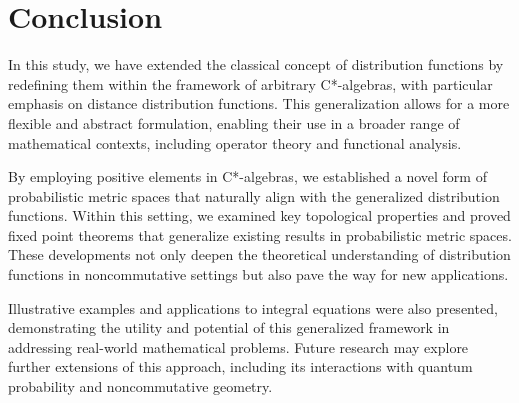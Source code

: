 \documentclass{amsart}%
\theoremstyle{plain}
\numberwithin{equation}{section}
\begin{document}
\section{Conclusion}

In this study, we have extended the classical concept of distribution functions by redefining them within the framework of arbitrary C*-algebras, with particular emphasis on distance distribution functions. This generalization allows for a more flexible and abstract formulation, enabling their use in a broader range of mathematical contexts, including operator theory and functional analysis.

By employing positive elements in C*-algebras, we established a novel form of probabilistic metric spaces that naturally align with the generalized distribution functions. Within this setting, we examined key topological properties and proved fixed point theorems that generalize existing results in probabilistic metric spaces. These developments not only deepen the theoretical understanding of distribution functions in noncommutative settings but also pave the way for new applications.

Illustrative examples and applications to integral equations were also presented, demonstrating the utility and potential of this generalized framework in addressing real-world mathematical problems. Future research may explore further extensions of this approach, including its interactions with quantum probability and noncommutative geometry.
\end{document}
